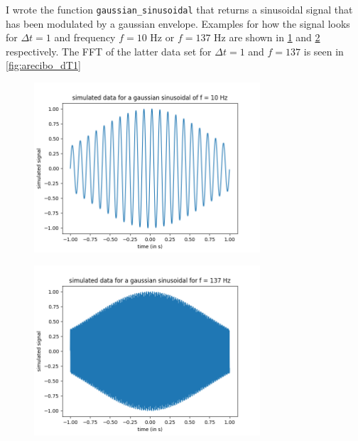 \documentclass{article}
\begin{document}
I wrote the function \texttt{gaussian_sinusoidal} that returns a sinusoidal signal that has been modulated by a gaussian envelope. Examples for how the signal looks for $\Delta t=1$ and frequency $f=10$ Hz or $f=137$ Hz are shown in \ref{fig:arecibo_gauss_sim} and \ref{fig:arecibo_gauss_sim137} respectively. The FFT of the latter data set for $\Delta t=1$ and $f=137$ is seen in \ref{fig:arecibo_dT1}

\begin{figure}[h!]
\centering
\includegraphics[width=0.75\textwidth]{plots/arecibo_gauss_sim.png}
\caption{\label{fig:arecibo_gauss_sim}  }
\end{figure}


\begin{figure}[h!]
\centering
\includegraphics[width=0.75\textwidth]{plots/arecibo_gauss_sim137.png}
\caption{\label{fig:arecibo_gauss_sim137}  }
\end{figure}
\end{document}
